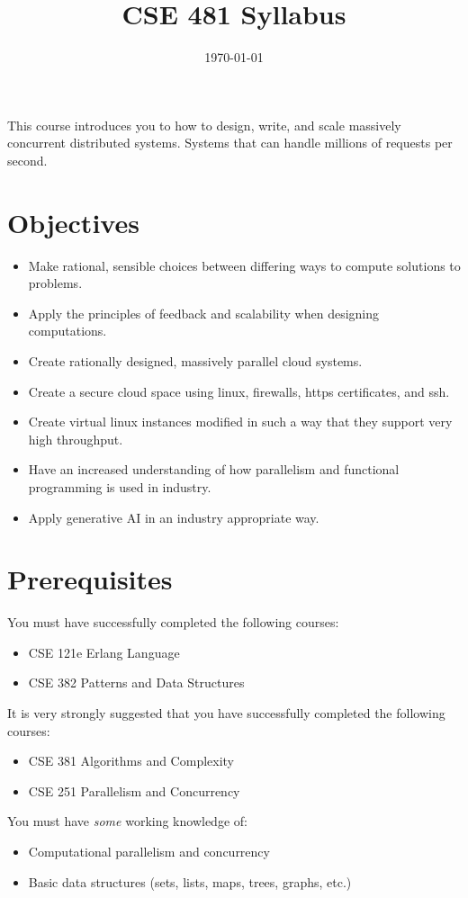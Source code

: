 \documentclass[12pt]{amsart}
\title{CSE 481 Syllabus}
\date{\today}
\begin{document}
\maketitle
This course introduces you to how to design, write, and scale massively concurrent distributed systems. Systems that can handle millions of requests per second.


\section{Objectives}
\begin{itemize}
	\item Make rational, sensible choices between differing ways to compute solutions to problems.
	\item Apply the principles of feedback and scalability when designing computations.
	\item Create rationally designed, massively parallel cloud systems.
	\item Create a secure cloud space using linux, firewalls, https certificates, and ssh.
	\item Create virtual linux instances modified in such a way that they support very high throughput.
	\item Have an increased understanding of how parallelism and functional programming is used in industry.
	\item Apply generative AI in an industry appropriate way.

\end{itemize}

\section{Prerequisites}

  You must have successfully completed the following courses:
\begin{itemize}
    \item CSE 121e Erlang Language
    \item CSE 382 Patterns and Data Structures
\end{itemize}
  It is very strongly suggested that you have successfully completed the following courses:
\begin{itemize}
    \item CSE 381 Algorithms and Complexity
    \item CSE 251 Parallelism and Concurrency
\end{itemize}
  You must have \textit{some} working knowledge of:
\begin{itemize}
     \item Computational parallelism and concurrency
     \item Basic data structures (sets, lists, maps, trees, graphs, etc.)
\end{itemize}
\end{document}
